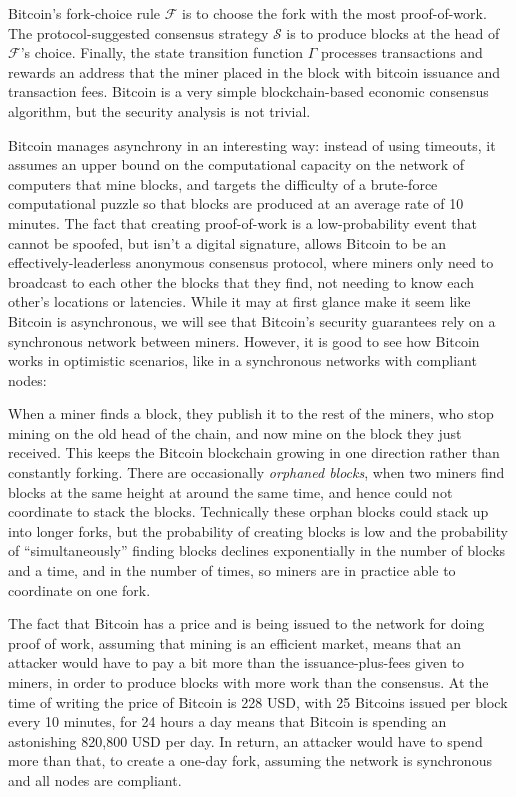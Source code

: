 \documentclass[11pt,a4paper]{article}
\theoremstyle{plain}
\theoremstyle{definition}
\begin{document}
Bitcoin's fork-choice rule $\mathcal{F}$ is to choose the fork with the most proof-of-work. The protocol-suggested consensus strategy $\mathcal{S}$ is to produce blocks at the head of $\mathcal{F}$'s choice. Finally, the state transition function $\Gamma$ processes transactions and rewards an address that the miner placed in the block with bitcoin issuance and transaction fees. Bitcoin is a very simple blockchain-based economic consensus algorithm, but the security analysis is not trivial.

Bitcoin manages asynchrony in an interesting way: instead of using timeouts, it assumes an upper bound on the computational capacity on the network of computers that mine blocks, and targets the difficulty of a brute-force computational puzzle so that blocks are produced at an average rate of 10 minutes. The fact that creating proof-of-work is a low-probability event that cannot be spoofed, but isn't a digital signature, allows Bitcoin to be an effectively-leaderless anonymous consensus protocol, where miners only need to broadcast to each other the blocks that they find, not needing to know each other's locations or latencies. While it may at first glance make it seem like Bitcoin is asynchronous, we will see that Bitcoin's security guarantees rely on a synchronous network between miners. However, it is good to see how Bitcoin works in optimistic scenarios, like in a synchronous networks with compliant nodes:

When a miner finds a block, they publish it to the rest of the miners, who stop mining on the old head of the chain, and now mine on the block they just received. This keeps the Bitcoin blockchain growing in one direction rather than constantly forking. There are occasionally \emph{orphaned blocks}, when two miners find blocks at the same height at around the same time, and hence could not coordinate to stack the blocks. Technically these orphan blocks could stack up into longer forks, but the probability of creating blocks is low and the probability of ``simultaneously'' finding blocks declines exponentially in the number of blocks and a time, and in the number of times, so miners are in practice able to coordinate on one fork.

The fact that Bitcoin has a price and is being issued to the network for doing proof of work, assuming that mining is an efficient market, means that an attacker would have to pay a bit more than the issuance-plus-fees given to miners, in order to produce blocks with more work than the consensus. At the time of writing the price of Bitcoin is 228 USD, with 25 Bitcoins issued per block every 10 minutes, for 24 hours a day means that Bitcoin is spending an astonishing 820,800 USD per day. In return, an attacker would have to spend more than that, to create a one-day fork, assuming the network is synchronous and all nodes are compliant.
\end{document}
